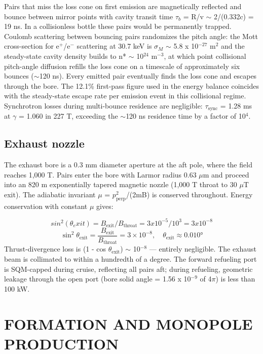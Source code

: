 \documentclass[12pt,a4paper]{article}
\begin{document}
Pairs that miss the loss cone on first emission are magnetically reflected and bounce between mirror points with cavity transit time $\tau_b$ = R/v $\sim$ 2/(0.332c) = 19 ns. In a collisionless bottle these pairs would be permanently trapped. Coulomb scattering between bouncing pairs randomizes the pitch angle: the Mott cross-section for e$^{+}$/e$^{-}$ scattering at 30.7 keV is $\sigma_M$ $\sim$ 5.8 x 10$^{-27}$ m$^{2}$ and the steady-state cavity density builds to n* $\sim$ 10$^{24}$ m$^{-3}$, at which point collisional pitch-angle diffusion refills the loss cone on a timescale of approximately six bounces ($\sim$120 ns). Every emitted pair eventually finds the loss cone and escapes through the bore. The 12.1\% first-pass figure used in the energy balance coincides with the steady-state escape rate per emission event in this collisional regime. Synchrotron losses during multi-bounce residence are negligible: $\tau_{\text{sync}}$ = 1.28 ms at $\gamma$ = 1.060 in 227 T, exceeding the $\sim$120 ns residence time by a factor of 10$^{4}$.

\subsection{Exhaust nozzle}
The exhaust bore is a 0.3 mm diameter aperture at the aft pole, where the field reaches 1,000 T. Pairs enter the bore with Larmor radius 0.63 $\mu$m and proceed into an 820 m exponentially tapered magnetic nozzle (1,000 T throat to 30 $\mu$T exit). The adiabatic invariant $\mu$ = $p_{\text{perp}} ^{2}$/(2mB) is conserved throughout. Energy conservation with constant $\mu$ gives:

\[
sin^{2}(\theta{}_exit) = B_{\text{exit}}/B_{\text{throat}} = 3 x 10^{-5}/10^{3} = 3 x 10^{-8}
\]
\begin{equation}
\sin^2\theta_\text{exit} = \frac{B_\text{exit}}{B_\text{throat}} = 3 \times 10^{-8}, \quad \theta_\text{exit} \approx 0.010°
\end{equation}
Thrust-divergence loss is (1 - cos $\theta_{\text{exit}}$) $\sim$ 10$^{-8}$ --- entirely negligible. The exhaust beam is collimated to within a hundredth of a degree. The forward refueling port is SQM-capped during cruise, reflecting all pairs aft; during refueling, geometric leakage through the open port (bore solid angle = 1.56 x 10$^{-9}$ of 4$\pi$) is less than 100 kW.

\section{FORMATION AND MONOPOLE PRODUCTION}
\end{document}
